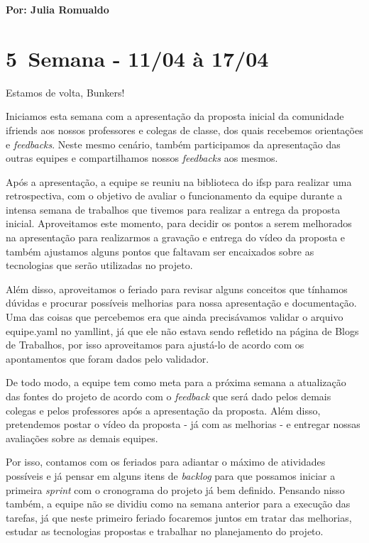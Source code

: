 \textbf{Por: Julia Romualdo} 

\section{5\textordfeminine \, Semana - 11/04 à 17/04}
 Estamos de volta, Bunkers!

Iniciamos esta semana com a apresentação da proposta inicial da comunidade \gls{ifriends} aos nossos professores e colegas de classe, dos quais recebemos orientações e \textsl{feedbacks}. Neste mesmo cenário, também participamos da apresentação das outras equipes e compartilhamos nossos \textsl{feedbacks} aos mesmos.

Após a apresentação, a equipe se reuniu na biblioteca do \acs{ifsp} para realizar uma retrospectiva, com o objetivo de avaliar o funcionamento da equipe durante a intensa semana de trabalhos que tivemos para realizar a entrega da proposta inicial. Aproveitamos este momento, para decidir os pontos a serem melhorados na apresentação para realizarmos a gravação e entrega do vídeo da proposta e também ajustamos alguns pontos que faltavam ser encaixados sobre as tecnologias que serão utilizadas no projeto.

Além disso, aproveitamos o feriado para revisar alguns conceitos que tínhamos dúvidas e procurar possíveis melhorias para nossa apresentação e documentação. Uma das coisas que percebemos era que ainda precisávamos validar o arquivo equipe.yaml no yamllint, já que ele não estava sendo refletido na página de Blogs de Trabalhos, por isso aproveitamos para ajustá-lo de acordo com os apontamentos que foram dados pelo validador.

De todo modo, a equipe tem como meta para a próxima semana a atualização das fontes do projeto de acordo com o \textsl{feedback} que será dado pelos demais colegas e pelos professores após a apresentação da proposta. Além disso, pretendemos postar o vídeo da proposta - já com as melhorias - e entregar nossas avaliações sobre as demais equipes.

Por isso, contamos com os feriados para adiantar o máximo de atividades possíveis e já pensar em alguns itens de \textsl{backlog} para que possamos iniciar a primeira \textsl{sprint} com o cronograma do projeto já bem definido. Pensando nisso também, a equipe não se dividiu como na semana anterior para a execução das tarefas, já que neste primeiro feriado focaremos juntos em tratar das melhorias, estudar as tecnologias propostas e trabalhar no planejamento do projeto.

